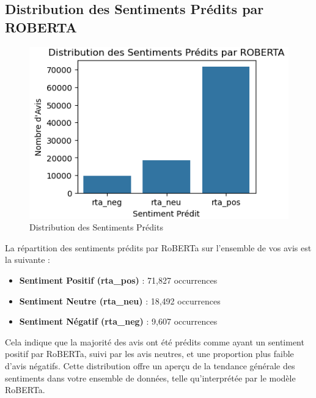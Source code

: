 \subsection{Distribution des Sentiments Prédits par ROBERTA}
\begin{figure}[h]
    \centering
    \includegraphics[scale=0.7]{assets/distributiondessentimentRoberta.PNG}
    \caption{Distribution des Sentiments Prédits}
    \label{fig:robertaSentiments}
\end{figure}

La répartition des sentiments prédits par RoBERTa sur l'ensemble de vos avis est la suivante :

\begin{itemize}
    \item \textbf{Sentiment Positif (rta\_pos)} : 71,827 occurrences
    \item \textbf{Sentiment Neutre (rta\_neu)} : 18,492 occurrences
    \item \textbf{Sentiment Négatif (rta\_neg)} : 9,607 occurrences
\end{itemize}

Cela indique que la majorité des avis ont été prédits comme ayant un sentiment positif par RoBERTa, suivi par les avis neutres, et une proportion plus faible d'avis négatifs. Cette distribution offre un aperçu de la tendance générale des sentiments dans votre ensemble de données, telle qu'interprétée par le modèle RoBERTa.


